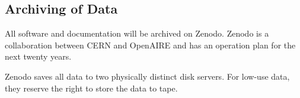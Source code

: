 \documentclass[11pt,oneside]{memoir}
\begin{document}


\subsection{Archiving of Data}
All software and documentation will be archived on Zenodo.  Zenodo is a collaboration between CERN and OpenAIRE and has an operation plan for the next twenty years.

Zenodo saves all data to two physically distinct disk servers.  For low-use data, they reserve the right to store the data to tape.

\end{document}
